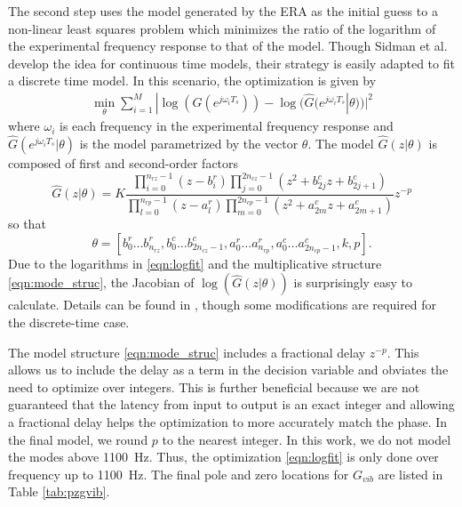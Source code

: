 \documentclass[journal,twocolumn,twoside]{IEEEtran}
\begin{document}
The second step uses the model generated by the ERA as the initial guess to a non-linear least squares problem \cite{sidman_parametric_1991} which minimizes the ratio of the logarithm of the experimental frequency response to that of the model. Though Sidman et al. develop the idea for continuous time models, their strategy is easily adapted to fit a discrete time model. In this scenario, the optimization is given by
\begin{align}
\min_{\theta} \sum_{i=1}^M| \log(G(e^{j\omega_iT_s})) - \log(\hat{G}(e^{j\omega_iT_s}|\theta))|^2
\label{eqn:logfit}
\end{align}
where $\omega_i$ is each frequency in the experimental frequency response and $\hat{G}(e^{j\omega_iT_s}|\theta)$ is the model parametrized by the vector $\theta$. The model $\hat{G}(z|\theta)$ is composed of first and second-order factors
\begin{equation}
  \hat{G}(z|\theta) =K \frac{\prod_{i=0}^{n_{rz}-1} (z-b^r_i) \prod_{j=0}^{2n_{cz}-1}(z^2 +b^c_{2j}z + b^c_{2j+1})}
  { \prod_{l=0}^{n_{rp}-1}(z-a^r_l) \prod_{m=0}^{2n_{cp}-1}(z^2 +a^c_{2m}z + a^c_{2m+1})}z^{-p} \label{eqn:mode_struc}
\end{equation}
so that
\begin{equation}
\theta = [b^r_0\dots b^r_{n_{rz}}, b^c_{0}\dots b^c_{2n_{cz}-1}, a^r_0\dots a^r_{n_{rp}}, a^c_{0}\dots a^c_{2n_{cp}-1}, k, p].
\end{equation}
Due to the logarithms in \eqref{eqn:logfit} and the multiplicative structure \eqref{eqn:mode_struc}, the Jacobian of $\log(\hat{G}(z|\theta))$ is surprisingly easy to calculate. Details can be found in \cite{sidman_parametric_1991}, though some modifications are required for the discrete-time case.

The model structure \eqref{eqn:mode_struc} includes a fractional delay $z^{-p}$. This allows us to include the delay as a term in the decision variable and obviates the need to optimize over integers. This is further beneficial because we are not guaranteed that the latency from input to output is an exact integer and allowing a fractional delay helps the optimization to more accurately match the phase. In the final model, we round $p$ to the nearest integer. In this work, we do not model the modes above 1100~Hz. Thus, the optimization \eqref{eqn:logfit} is only done over frequency up to 1100~Hz. The final pole and zero locations for $G_{vib}$ are listed in Table \ref{tab:pzgvib}.
\end{document}
